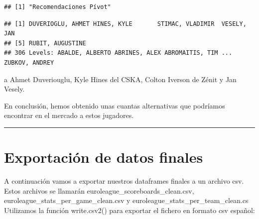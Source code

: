 \documentclass[
]{article}
\newenvironment{Shaded}{\begin{snugshade}}{\end{snugshade}}
\newcommand{\DecValTok}[1]{\textcolor[rgb]{0.00,0.00,0.81}{#1}}
\newcommand{\KeywordTok}[1]{\textcolor[rgb]{0.13,0.29,0.53}{\textbf{#1}}}
\newcommand{\NormalTok}[1]{#1}
\newcommand{\OperatorTok}[1]{\textcolor[rgb]{0.81,0.36,0.00}{\textbf{#1}}}
\begin{document}
\begin{verbatim}
## [1] "Recomendaciones Pívot"
\end{verbatim}

\begin{Shaded}
\end{Shaded}

\begin{verbatim}
## [1] DUVERIOGLU, AHMET HINES, KYLE       STIMAC, VLADIMIR  VESELY, JAN      
## [5] RUBIT, AUGUSTINE 
## 306 Levels: ABALDE, ALBERTO ABRINES, ALEX ABROMAITIS, TIM ... ZUBKOV, ANDREY
\end{verbatim}

a Ahmet Duveriouglu, Kyle Hines del CSKA, Colton Iverson de Zénit y Jan
Vesely.

En conclusión, hemos obtenido unas cuantas alternativas que podríamos
encontrar en el mercado a estos jugadores.

\begin{center}\rule{0.5\linewidth}{0.5pt}\end{center}

\newpage

\hypertarget{exportaciuxf3n-de-datos-finales}{%
\section{Exportación de datos
finales}\label{exportaciuxf3n-de-datos-finales}}

A continuación vamos a exportar nuestros dataframes finales a un archivo
csv. Estos archivos se llamarán euroleague\_scoreboards\_clean.csv,
euroleague\_stats\_per\_game\_clean.csv y
euroleague\_stats\_per\_team\_clean.cs Utilizamos la función
write.csv2() para exportar el fichero en formato csv español:
\end{document}
